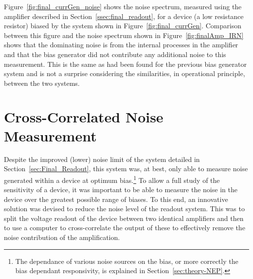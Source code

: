 \par
Figure~\ref{fig:final_currGen_noise} shows the noise spectrum, measured using the amplifier described in Section~\ref{ssec:final_readout}, for a device (a low resistance resistor) biased by the system shown in Figure~\ref{fig:final_currGen}. Comparison between this figure and the noise spectrum shown in Figure~\ref{fig:finalAmp_IRN} shows that the dominating noise is from the internal processes in the amplifier and that the bias generator did not contribute any additional noise to this measurement. This is the same as had been found for the previous bias generator system and is not a surprise considering the similarities, in operational principle, between the two systems.
%
\section{Cross-Correlated Noise Measurement}\label{sec:cross_col_noise}
Despite the improved (lower) noise limit of the system detailed in Section~\ref{sec:Final_Readout}, this system was, at best, only able to measure noise generated within a device at optimum bias.\footnote{The dependance of various noise sources on the bias, or more correctly the bias dependant responsivity, is explained in Section~\ref{sec:theory-NEP}.} To allow a full study of the sensitivity of a device, it was important to be able to measure the noise in the device over the greatest possible range of biases. To this end, an innovative solution was devised to reduce the noise level of the readout system. This was to split the voltage readout of the device between two identical amplifiers and then to use a computer to cross-correlate the output of these to effectively remove the noise contribution of the amplification.
%
